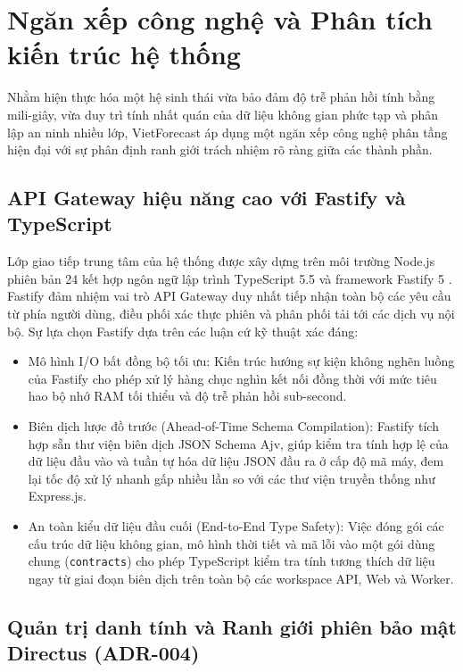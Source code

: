 \section{Ngăn xếp công nghệ và Phân tích kiến trúc hệ thống}

Nhằm hiện thực hóa một hệ sinh thái vừa bảo đảm độ trễ phản hồi tính bằng mili-giây, vừa duy trì tính nhất quán của dữ liệu không gian phức tạp và phân lập an ninh nhiều lớp, VietForecast áp dụng một ngăn xếp công nghệ phân tầng hiện đại với sự phân định ranh giới trách nhiệm rõ ràng giữa các thành phần.

\subsection{API Gateway hiệu năng cao với Fastify và TypeScript}

Lớp giao tiếp trung tâm của hệ thống được xây dựng trên môi trường Node.js phiên bản 24 kết hợp ngôn ngữ lập trình TypeScript 5.5 và framework Fastify 5 \cite{fastify2024}. Fastify đảm nhiệm vai trò API Gateway duy nhất tiếp nhận toàn bộ các yêu cầu từ phía người dùng, điều phối xác thực phiên và phân phối tải tới các dịch vụ nội bộ. Sự lựa chọn Fastify dựa trên các luận cứ kỹ thuật xác đáng:
\begin{itemize}
    \item[-] Mô hình I/O bất đồng bộ tối ưu: Kiến trúc hướng sự kiện không nghẽn luồng của Fastify cho phép xử lý hàng chục nghìn kết nối đồng thời với mức tiêu hao bộ nhớ RAM tối thiểu và độ trễ phản hồi sub-second.
    \item[-] Biên dịch lược đồ trước (Ahead-of-Time Schema Compilation): Fastify tích hợp sẵn thư viện biên dịch JSON Schema Ajv, giúp kiểm tra tính hợp lệ của dữ liệu đầu vào và tuần tự hóa dữ liệu JSON đầu ra ở cấp độ mã máy, đem lại tốc độ xử lý nhanh gấp nhiều lần so với các thư viện truyền thống như Express.js.
    \item[-] An toàn kiểu dữ liệu đầu cuối (End-to-End Type Safety): Việc đóng gói các cấu trúc dữ liệu không gian, mô hình thời tiết và mã lỗi vào một gói dùng chung (\texttt{contracts}) cho phép TypeScript kiểm tra tính tương thích dữ liệu ngay từ giai đoạn biên dịch trên toàn bộ các workspace API, Web và Worker.
\end{itemize}

\subsection{Quản trị danh tính và Ranh giới phiên bảo mật Directus (ADR-004)}

